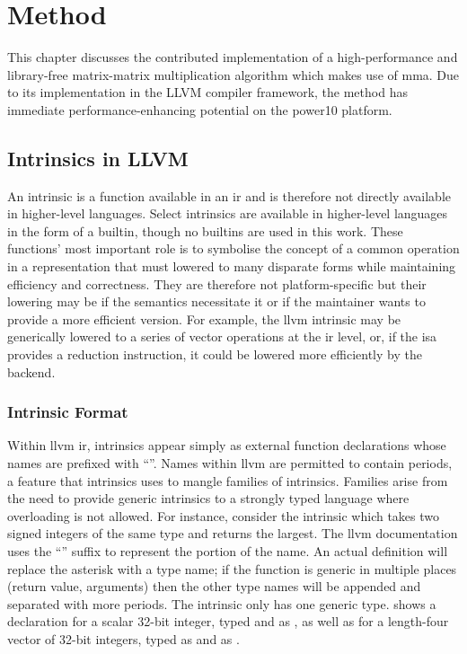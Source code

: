 \documentclass[\main/thesis.tex]{subfiles}
\begin{document}
\chapter{Method}
\label{cha:method}
This chapter discusses the contributed implementation of a high-performance and library-free matrix-matrix multiplication algorithm which makes use of \gls{mma}.
Due to its implementation in the LLVM compiler framework, the method has immediate performance-enhancing potential on the \gls{power10} platform.

\section{Intrinsics in LLVM}
An \gls{intrinsic} is a function available in an \gls{ir} and is therefore not directly available in higher-level languages.
Select \glspl{intrinsic} are available in higher-level languages in the form of a \gls{builtin}, though no \glspl{builtin} are used in this work.\footnotemark
{}
These functions' most important role is to symbolise the concept of a common operation in a representation that must lowered to many disparate forms while maintaining efficiency and correctness.
They are therefore not platform-specific but their lowering may be if the semantics necessitate it or if the maintainer wants to provide a more efficient version.
For example, the \gls{llvm} \gls{intrinsic}  may be generically lowered to a series of vector operations at the \gls{ir} level, or, if the \gls{isa} provides a reduction instruction, it could be lowered more efficiently by the backend.

\subsection{Intrinsic Format}
Within \gls{llvm} \gls{ir}, \glspl{intrinsic} appear simply as external function declarations whose names are prefixed with ``''.
Names within \gls{llvm} are permitted to contain periods, a feature that \glspl{intrinsic} uses to \gls{mangle}  families of \glspl{intrinsic}.
Families arise from the need to provide generic \glspl{intrinsic} to a strongly typed language where overloading is not allowed.
For instance, consider the  \gls{intrinsic} which takes two signed integers of the same type and returns the largest.
The \gls{llvm} documentation uses the ``'' suffix to represent the  portion of the name.
An actual definition will replace the asterisk with a type name; if the function is generic in multiple places (return value, arguments) then the other type names will be appended and separated with more periods.
The  \gls{intrinsic} only has one generic type.
 shows a declaration for a scalar 32-bit integer, typed and  as , as well as for a length-four vector of 32-bit integers, typed as  and  as .
\end{document}

